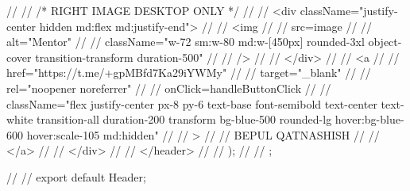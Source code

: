 {// //                 {/* RIGHT IMAGE DESKTOP ONLY */}
// //                 <div className="justify-center hidden md:flex md:justify-end">
// //                     <img
// //                         src={image}
// //                         alt="Mentor"
// //                         className="w-72 sm:w-80 md:w-[450px] rounded-3xl object-cover transition-transform duration-500"
// //                     />
// //                 </div>
// //                 <a
// //                     href="https://t.me/+gpMBfd7Ka29iYWMy"
// //                     target="_blank"
// //                     rel="noopener noreferrer"
// //                     onClick={handleButtonClick}
// //                     className="flex justify-center px-8 py-6 text-base font-semibold text-center text-white transition-all duration-200 transform bg-blue-500 rounded-lg hover:bg-blue-600 hover:scale-105 md:hidden"
// //                 >
// //                     BEPUL QATNASHISH
// //                 </a>
// //             </div>
// //         </header>
// //     );
// // };

// // export default Header;
